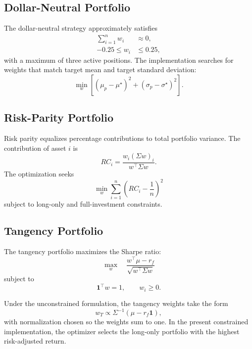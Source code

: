 \documentclass[wcp]{jmlr}
\begin{document}
\begin{abstract - TEST}
\subsection{Dollar-Neutral Portfolio}

The dollar-neutral strategy approximately satisfies
\begin{align}
\sum_{i=1}^n w_i &\approx 0, \\
-0.25 \leq w_i &\leq 0.25,
\end{align}
with a maximum of three active positions. The implementation searches for weights that match target mean and target standard deviation:
\begin{equation}
\min_w \left[ (\mu_p - \mu^\star)^2 + (\sigma_p - \sigma^\star)^2 \right].
\end{equation}

\subsection{Risk-Parity Portfolio}

Risk parity equalizes percentage contributions to total portfolio variance. The contribution of asset $i$ is
\begin{equation}
RC_i = \frac{w_i (\Sigma w)_i}{w^\top \Sigma w}.
\end{equation}
The optimization seeks
\begin{equation}
\min_w \sum_{i=1}^n \left(RC_i - \frac{1}{n}\right)^2
\end{equation}
subject to long-only and full-investment constraints.

\subsection{Tangency Portfolio}

The tangency portfolio maximizes the Sharpe ratio:
\begin{equation}
\max_w \quad \frac{w^\top \mu - r_f}{\sqrt{w^\top \Sigma w}}
\end{equation}
subject to
\begin{equation}
\mathbf{1}^\top w = 1, \qquad w_i \geq 0.
\end{equation}

Under the unconstrained formulation, the tangency weights take the form
\begin{equation}
w_T \propto \Sigma^{-1}(\mu - r_f \mathbf{1}),
\end{equation}
with normalization chosen so the weights sum to one. In the present constrained implementation, the optimizer selects the long-only portfolio with the highest risk-adjusted return.


\end{abstract - TEST}
\end{document}
